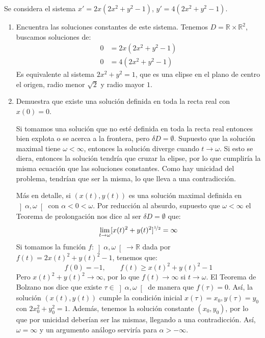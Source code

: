 \documentclass[12pt]{article}
\begin{document}
    \begin{ejercicio}
        Se considera el sistema $x'=2x(2x^2+y^2-1)$, $y'=4(2x^2+y^2-1)$.
        \begin{enumerate}
            \item[$i)$] Encuentra las soluciones constantes de este sistema.
                Tenemos $D=\mathbb{R}\times \mathbb{R}^2$, buscamos soluciones de:
                \begin{align*}
                    0 &= 2x(2x^2+y^2-1) \\
                    0 &= 4(2x^2+y^2-1)
                \end{align*}
                Es equivalente al sistema $2x^2+y^2 = 1$, que es una elipse en el plano de centro el origen, radio menor $\sqrt{2}$ y radio mayor $1$.
            \item[$ii)$] Demuestra que existe una solución definida en toda la recta real con $x(0) = 0$.

                Si tomamos una solución que no esté definida en toda la recta real entonces bien explota o se acerca a la frontera, pero $\delta D =\emptyset $. Supuesto que la solución maximal tiene $\omega<\infty$, entonces la solución diverge cuando $t\to \omega$. Si esto se diera, entonces la solución tendría que cruzar la elipse, por lo que cumpliría la misma ecuación que las soluciones constantes. Como hay unicidad del problema, tendrían que ser la misma, lo que lleva a una contradicción.

                Más en detalle, si $(x(t),y(t))$ es una solución maximal definida en $\left]\alpha,\omega\right[$ con $\alpha<0<\omega$. Por reducción al absurdo, supuesto que $\omega<\infty$ el Teorema de prolongación nos dice al ser $\delta D = \emptyset $ que:
                \begin{equation*}
                    \lim_{t\to\omega}[x(t)^2 + y(t)^2]^{\nicefrac{1}{2}} = \infty
                \end{equation*}
                Si tomamos la función $f:\left]\alpha,\omega\right[\to \mathbb{R}$ dada por $f(t) = 2x(t)^2 + y(t)^2 - 1$, tenemos que:
                \begin{equation*}
                    f(0) = -1, \qquad f(t)\geq x(t)^2 + y(t)^2 - 1
                \end{equation*}
                Pero $x(t)^2 + y(t)^2 \to \infty$, por lo que $f(t)\to \infty$ si $t\to \omega$. El Teorema de Bolzano nos dice que existe $\tau \in \left]\alpha,\omega\right[$ de manera que $f(\tau) = 0$. Así, la solución $(x(t),y(t))$ cumple la condición inicial $x(\tau) = x_0, y(\tau) = y_0$ con $2x_0^2 + y_0^2 = 1$. Además, tenemos la solución constante $(x_0,y_0)$, por lo que por unicidad deberían ser las mismas, llegando a una contradicción. Así, $\omega = \infty$  y un argumento análogo serviría para $\alpha>-\infty$.
        \end{enumerate}
    \end{ejercicio}
\end{document}
